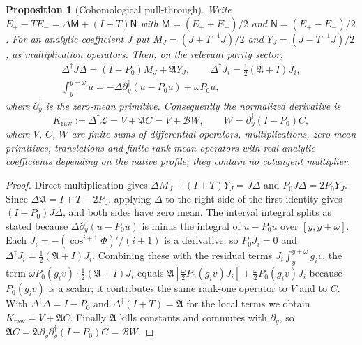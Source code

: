 \documentclass[11pt]{amsart}
\numberwithin{equation}{section}
\newtheorem{proposition}[theorem]{Proposition}
\theoremstyle{definition}
\theoremstyle{remark}
\newcommand{\cA}{\mathfrak A}
\newcommand{\cB}{\mathcal B}
\begin{document}
\begin{proposition}[Cohomological pull-through]\label{prop:pullthrough}
Write $E_+-TE_-=\Delta\mathsf M+(I+T)\mathsf N$ with $\mathsf M=(E_++E_-)/2$ and $\mathsf N=(E_+-E_-)/2$. For an analytic coefficient $J$ put $M_J=(J+T^{-1}J)/2$ and $Y_J=(J-T^{-1}J)/2$, as multiplication operators. Then, on the relevant parity sector,
\begin{equation}\label{eq:pull}
\begin{gathered}
\Delta^\dagger J\Delta=(I-P_0)M_J+\cA Y_J,\qquad \Delta^\dagger J_i=\tfrac12(\cA+I)J_i,\\
\int_y^{y+\omega}u=-\Delta\partial_y^\dagger(u-P_0u)+\omega P_0u,
\end{gathered}
\end{equation}
where $\partial_y^\dagger$ is the zero-mean primitive. Consequently the normalized derivative is
\begin{equation}\label{eq:KVBW}
K_{\mathrm{raw}}:=\Delta^\dagger\mathcal L=V+\cA C=V+\cB W,\qquad W=\partial_y^\dagger(I-P_0)C,
\end{equation}
where $V$, $C$, $W$ are finite sums of differential operators, multiplications, zero-mean primitives, translations and finite-rank mean operators with real analytic coefficients depending on the native profile; they contain no cotangent multiplier.
\end{proposition}

\begin{proof}
Direct multiplication gives $\Delta M_J+(I+T)Y_J=J\Delta$ and $P_0J\Delta=2P_0Y_J$. Since $\Delta\cA=I+T-2P_0$, applying $\Delta$ to the right side of the first identity gives $(I-P_0)J\Delta$, and both sides have zero mean. The interval integral splits as stated because $\Delta\partial_y^\dagger(u-P_0u)$ is minus the integral of $u-P_0u$ over $[y,y+\omega]$. Each $J_i=-(\cos^{i+1}\Phi)'/(i+1)$ is a derivative, so $P_0J_i=0$ and $\Delta^\dagger J_i=\frac12(\cA+I)J_i$. Combining these with the residual terms $J_i\int_y^{y+\omega}g_iv$, the term $\omega P_0(g_iv)\cdot\frac12(\cA+I)J_i$ equals $\cA[\frac\omega2P_0(g_iv)J_i]+\frac\omega2P_0(g_iv)J_i$ because $P_0(g_iv)$ is a scalar; it contributes the same rank-one operator to $V$ and to $C$. With $\Delta^\dagger\Delta=I-P_0$ and $\Delta^\dagger(I+T)=\cA$ for the local terms we obtain $K_{\mathrm{raw}}=V+\cA C$. Finally $\cA$ kills constants and commutes with $\partial_y$, so $\cA C=\cA\partial_y\partial_y^\dagger(I-P_0)C=\cB W$.
\end{proof}
\end{document}
